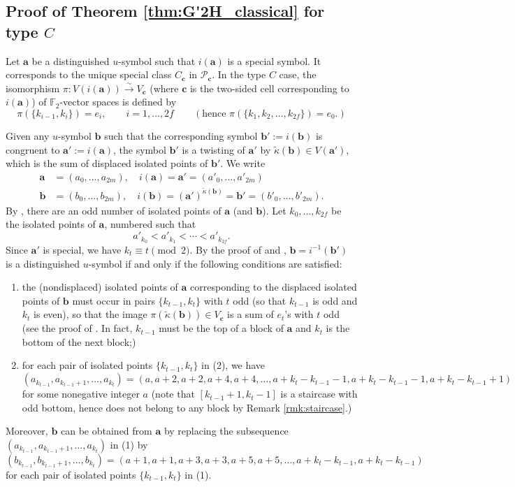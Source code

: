 \documentclass{amsart}
\theoremstyle{definition}
\newcommand{\F}{\mathbb{F}}
\newcommand{\cP}{\mathcal{P}}
\newcommand{\ba}{\mathbf{a}}
\newcommand{\bb}{\mathbf{b}}
\newcommand{\bc}{{\mathbf{c}}}
\newcommand{\0}{\mathcal{O}}
\begin{document}
\subsection{Proof of Theorem \ref{thm:G'2H_classical} for type $C$}

Let $\ba$ be a distinguished $u$-symbol such that $i(\ba)$ is a special symbol. It corresponds to the unique special class $C_\bc$ in $\cP_\bc$. In the type $C$ case, the isomorphism $\pi: V(i(\ba)) \xrightarrow{\sim} V_\bc$ (where $\bc$ is the
two-sided cell corresponding to $i(\ba)$) of $\F_2$-vector spaces is defined by 
\[
\pi(\{k_{i-1}, k_i\}) = e_i, \qquad i = 1, \ldots, 2f
\qquad
(\text{hence }\pi(\{k_1, k_2, \ldots, k_{2f}\}) = e_0.)
\]


Given any $u$-symbol $\bb$ such that the corresponding symbol $\bb':=i(\bb)$ is congruent to $\ba' :=i(\ba)$, the symbol $\bb'$ is a twisting of $\ba'$ by $\tilde{\kappa}(\bb) \in V(\ba')$, which is the sum of displaced isolated points of $\bb'$. 
We write
\begin{align*}
	\ba &= (a_0, \ldots, a_{2m}), \quad
	i(\ba) = \ba' = (a'_0, \ldots, a'_{2m}) \\
	\bb &= (b_0, \ldots, b_{2m}), \quad
	i(\bb) = (\ba')^{\tilde{\kappa}(\bb)} = \bb' = (b'_0, \ldots, b'_{2m}).
\end{align*}
By \cite[Lemma 4.2]{Achar-Sage-special}, there are an odd number of isolated points of $\ba$ (and $\bb$). 
Let $k_0, \ldots, k_{2f}$
be the isolated points of $\ba$, numbered such that
\[
a'_{k_0} < a'_{k_1} < \cdots < a'_{k_{2f}}.
\]
Since $\ba'$ is special, we have $k_t \equiv t \pmod{2}$. 
By the proof of \cite[Prop. 4.6]{Achar-Sage-special} and \cite[\S\, 1.7]{Lusztig:unipotent}, $\bb = i^{-1}(\bb')$ is a distinguished $u$-symbol if and only if the following conditions are satisfied:
\begin{enumerate}[leftmargin=*]
	\item 
		the (nondisplaced) isolated points of $\ba$ corresponding to the displaced isolated points of $\bb$ must occur in pairs $\{k_{t-1}, k_{t}\} $ with $t$ odd (so that $k_{t-1}$ is odd and $k_t$ is even), so that the image $\pi(\tilde{\kappa}(\bb)) \in V_\bc$ is a sum of $e_t$'s with $t$ odd (see the proof of \cite[Prop. 4.5]{Achar-Sage-special}. In fact, $k_{t-1}$ must be the top of a  block of $\ba$ and $k_t$ is the bottom of the next block;) 
	\item
		for each pair of isolated points $\{k_{t-1}, k_{t}\}$ in (2), we have
		\[ (a_{k_{t-1}}, a_{k_{t-1}+1}, \ldots, a_{k_t}) = (a, a+2, a+2, a+4, a+4, \ldots, a+k_t-k_{t-1}-1, a+k_t-k_{t-1}-1, a+k_t-k_{t-1}+1) \]
		for some nonegative integer $a$ (note that $[k_{t-1}+1, k_{t}-1]$ is a staircase with odd bottom, hence does not belong to any block by Remark \ref{rmk:staircase}.)
\end{enumerate}
Moreover, $\bb$ can be obtained from $\ba$ by replacing the subsequence $(a_{k_{t-1}}, a_{k_{t-1}+1}, \ldots, a_{k_t})$ in (1) by 
 	\[ (b_{k_{t-1}}, b_{k_{t-1}+1}, \ldots, b_{k_t}) = (a+1, a+1, a+3, a+3, a+5, a+5, \ldots, a+k_t-k_{t-1}, a+k_t-k_{t-1})\]
for each pair of isolated points $\{k_{t-1}, k_{t}\}$ in (1).
\end{document}
